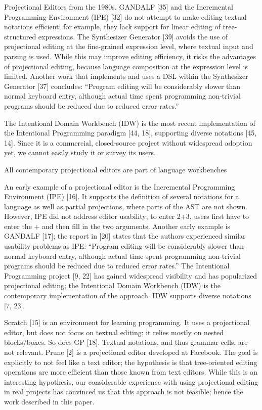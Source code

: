 Projectional Editors from the 1980s.
GANDALF [35] and the Incremental Programming Environment (IPE) [32] do not attempt to make editing textual notations efficient; for example, they lack support for linear editing of tree-structured expressions.
The Synthesizer Generator [39] avoids the use of projectional editing at the fine-grained expression level, where textual input and parsing is used.
While this may improve editing efficiency, it risks the advantages of projectional editing, because language composition at the expression level is limited.
Another work that implements and uses a DSL within the Synthesizer Generator [37] concludes: “Program editing will be considerably slower than normal keyboard entry, although actual time spent programming non-trivial programs should be reduced due to reduced error rates.”

The Intentional Domain Workbench (IDW) is the most recent implementation of the Intentional Programming paradigm [44, 18], supporting diverse notations [45, 14].
Since it is a commercial, closed-source project without widespread adoption yet, we cannot easily study it or survey its users.


All contemporary projectional editors are part of language workbenches

An early example of a projectional editor is the Incremental Programming Environment (IPE) [16].
It supports the definition of several notations for a language as well as partial projections, where parts of the AST are not shown.
However, IPE did not address editor usability; to enter 2+3, users first have to enter the + and then fill in the two arguments.
Another early example is GANDALF [17]; the report in [20] states that the authors experienced similar usability problems as IPE: “Program editing will be considerably slower than normal keyboard entry, although actual time spent programming non-trivial programs should be reduced due to reduced error rates.”
The Intentional Programming project [9, 22] has gained widespread visibility and has popularized projectional editing; the Intentional Domain Workbench (IDW) is the contemporary implementation of the approach.
IDW supports diverse notations [7, 23].

Scratch [15] is an environment for learning programming.
It uses a projectional editor, but does not focus on textual editing; it relies mostly on nested blocks/boxes.
So does GP [18].
Textual notations, and thus grammar cells, are not relevant.
Prune [2] is a projectional editor developed at Facebook.
The goal is explicitly to not feel like a text editor; the hypothesis is that tree-oriented editing operations are more efficient than those known from text editors.
While this is an interesting hypothesis, our considerable experience with using projectional editing in real projects has convinced us that this approach is not feasible; hence the work described in this paper.

